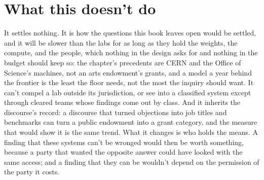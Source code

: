\section{What this doesn't do}
\label{sec:28.8}
It settles nothing. It is how the questions this book leaves open would be settled, and it will be slower than the labs for as long as they hold the weights, the compute, and the people, which nothing in the design asks for and nothing in the budget should keep so: the chapter's precedents are CERN and the Office of Science's machines, not an arts endowment's grants, and a model a year behind the frontier is the least the floor needs, not the most the inquiry should want. It can't compel a lab outside its jurisdiction, or see into a classified system except through cleared teams whose findings come out by class. And it inherits the discourse's record: a discourse that turned objections into job titles and benchmarks can turn a public endowment into a grant category, and the measure that would show it is the same trend. What it changes is who holds the means. A finding that these systems can't be wronged would then be worth something, because a party that wanted the opposite answer could have looked with the same access; and a finding that they can be wouldn't depend on the permission of the party it costs.
